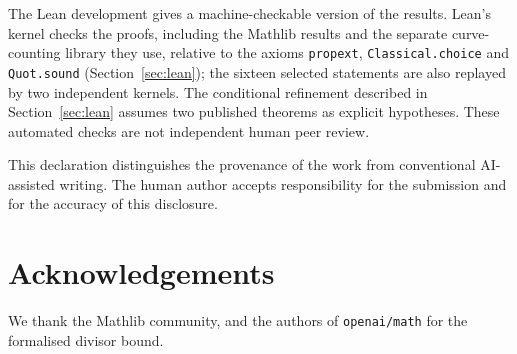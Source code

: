 \documentclass[11pt]{article}
\theoremstyle{definition}
\theoremstyle{remark}
\newcommand{\lean}[1]{\nolinkurl{#1}}
\begin{document}
The Lean development gives a machine-checkable version of the results. Lean's
kernel checks the proofs, including the Mathlib results and the separate
curve-counting library they use, relative to the axioms \lean{propext},
\lean{Classical.choice} and \lean{Quot.sound} (Section~\ref{sec:lean}); the
sixteen selected statements are also replayed by two independent kernels. The
conditional refinement described in Section~\ref{sec:lean} assumes two
published theorems as explicit hypotheses. These automated checks are not
independent human peer review.

This declaration distinguishes the provenance of the work from conventional
AI-assisted writing. The human author accepts responsibility for the
submission and for the accuracy of this disclosure.

\section*{Acknowledgements}
We thank the Mathlib community, and the authors of \lean{openai/math} for the
formalised divisor bound.
\end{document}
